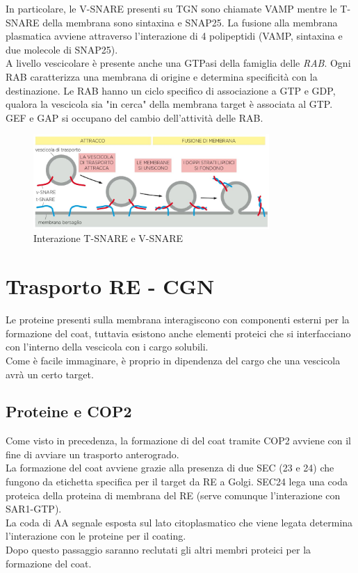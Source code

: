         In particolare, le V-SNARE presenti su TGN sono chiamate VAMP mentre le T-SNARE della membrana sono sintaxina e SNAP25. La fusione alla membrana plasmatica avviene attraverso l'interazione di 4 polipeptidi (VAMP, sintaxina e due molecole di SNAP25).\\
        
        A livello vescicolare è presente anche una GTPasi della famiglia delle \textit{RAB}. Ogni RAB caratterizza una membrana di origine e determina specificità con la destinazione. 
        Le RAB hanno un ciclo specifico di associazione a GTP e GDP, qualora la vescicola sia "in cerca" della membrana target è associata al GTP. GEF e GAP si occupano del cambio dell'attività delle RAB.
        \begin{figure}[h]
            \centering
            \includegraphics[width=0.8\textwidth]{images/VTSNARE.JPG}
            \caption{\small Interazione T-SNARE e V-SNARE}
            \label{fig:mesh1}
        \end{figure}
    
\section{Trasporto RE - CGN}
    Le proteine presenti sulla membrana interagiscono con componenti esterni per la formazione del coat, tuttavia esistono anche elementi proteici che si interfacciano con l'interno della vescicola con i cargo solubili. \\
    Come è facile immaginare, è proprio in dipendenza del cargo che una vescicola avrà un certo target.
    \subsection{Proteine e COP2}
        Come visto in precedenza, la formazione di del coat tramite COP2 avviene con il fine di avviare un trasporto anterogrado. \\
        La formazione del coat avviene grazie alla presenza di due SEC (23 e 24) che fungono da etichetta specifica per il target da RE a Golgi. SEC24 lega una coda proteica della proteina di membrana del RE (serve comunque l'interazione con SAR1-GTP).\\
        La coda di AA segnale esposta sul lato citoplasmatico che viene legata determina l'interazione con le proteine per il coating.\\
        Dopo questo passaggio saranno reclutati gli altri membri proteici per la formazione del coat.
        
